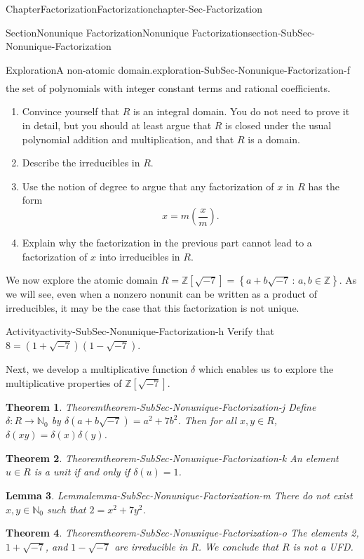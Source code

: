 \documentclass[oneside,10pt,]{book}
\numberwithin{equation}{section}
\newcommand{\setof}[2]{{\left\{#1\,\colon\,#2\right\}}}
\def\Z{{\mathbb Z}}
\def\N{{\mathbb N}}
\newtheorem{theorem}{Theorem}[section]
\newtheorem{lemma}[theorem]{Lemma}
\begin{document}
\begin{chapterptx}{Chapter}{Factorization}{}{Factorization}{}{}{chapter-Sec-Factorization}
\begin{sectionptx}{Section}{Nonunique Factorization}{}{Nonunique Factorization}{}{}{section-SubSec-Nonunique-Factorization}
\begin{exploration}{Exploration}{A non-atomic domain.}{exploration-SubSec-Nonunique-Factorization-f}
\begin{align*}
\end{align*}
the set of polynomials with integer constant terms and rational coefficients.%
%
\begin{enumerate}
\item{}Convince yourself that \(R\) is an integral domain. You do not need to prove it in detail, but you should at least argue that \(R\) is closed under the usual polynomial addition and multiplication, and that \(R\) is a domain.%
\item{}Describe the irreducibles in \(R\).%
\item{}Use the notion of degree to argue that any factorization of \(x\) in \(R\) has the form%
\begin{equation*}
x = m\left(\frac{x}{m}\right).
\end{equation*}
%
\item{}Explain why the factorization in the previous part cannot lead to a factorization of \(x\) into irreducibles in \(R\).%
\end{enumerate}
\end{exploration}%
%
We now explore the atomic domain \(R = \Z[\sqrt{-7}] = \setof{a+b\sqrt{-7}}{a,b\in\Z}\). As we will see, even when a nonzero nonunit can be written as a product of irreducibles, it may be the case that this factorization is not unique.%
\begin{activity}{Activity}{}{activity-SubSec-Nonunique-Factorization-h}%
Verify that \(8 = (1+\sqrt{-7})(1-\sqrt{-7})\).%
\end{activity}%
Next, we develop a multiplicative function \(\delta\) which enables us to explore the multiplicative properties of \(\Z[\sqrt{-7}]\).%
\begin{theorem}{Theorem}{}{}{theorem-SubSec-Nonunique-Factorization-j}%
Define \(\delta : R \to \N_0\) by \(\delta(a+b\sqrt{-7}) = a^2 + 7 b^2\). Then for all \(x,y\in R\), \(\delta(xy) = \delta(x)\delta(y)\).%
\end{theorem}
\begin{theorem}{Theorem}{}{}{theorem-SubSec-Nonunique-Factorization-k}%
An element \(u\in R\) is a unit if and only if \(\delta(u) = 1\).%
\end{theorem}
\begin{lemma}{Lemma}{}{}{lemma-SubSec-Nonunique-Factorization-m}%
There do not exist \(x,y\in \N_0\) such that \(2 = x^2 + 7y^2\).%
\end{lemma}
\begin{theorem}{Theorem}{}{}{theorem-SubSec-Nonunique-Factorization-o}%
The elements 2, \(1+ \sqrt{-7}\), and \(1-\sqrt{-7}\) are irreducible in \(R\). We conclude that \(R\) is not a UFD.%
\end{theorem}
\end{sectionptx}
\end{chapterptx}
\end{document}
